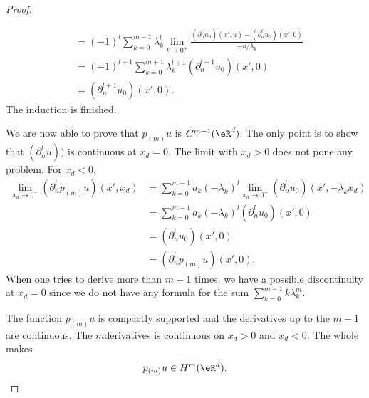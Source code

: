\begin{proof}
\begin{subproof}
\begin{subequations}
\begin{align}
                    &=(-1)^l\sum_{k=0}^{m-1}\lambda_k^l\lim_{t\to 0^+} \frac{    (\partial_n^lu_0)(x',u)- (\partial_n^lu_0)(x',0)   }{ -u/\lambda_k }\\
                    &=(-1)^{l+1}\sum_{k=0}^{m+1}\lambda_k^{l+1}(\partial_n^{l+1}u_0)(x',0)\\
                    &=(\partial^{l+1}_nu_0)(x',0).
                \end{align}
            \end{subequations}
            The induction is finished.
    \end{subproof}
    We are now able to prove that \( p_{(m)}u\) is \( C^{m-1}(\eR^d)\). The only point is to show that \( (\partial^l_nu))\) is continuous at \( x_d=0\). The limit with \( x_d>0\) does not pone any problem. For \( x_d<0\),
    \begin{subequations}
        \begin{align}
            \lim_{x_d\to 0^-}(\partial_n^lp_{(m)}u)(x',x_d)&=\sum_{k=0}^{m-1}a_k(-\lambda_k)^l\lim_{x_d\to 0^-}(\partial_n^lu_0)(x',-\lambda_kx_d)\\
            &=\sum_{k=0}^{m-1}a_k(-\lambda_k)^l(\partial_n^lu_0)(x',0)\\
            &=(\partial_n^lu_0)(x',0)\\
            &=(\partial^l_np_{(m)}u)(x',0).
        \end{align}
    \end{subequations}
    When one tries to derive more than \( m-1\) times, we have a possible discontinuity at \( x_d=0\) since we do not have any formula for the sum \( \sum_{k=0}^{m-1}k\lambda_k^m\).

    The function \(p_{(m)}u\) is compactly supported and the derivatives up to the \( m-1\)\ieme are continuous. The \( m\)\ieme derivatives is continuous on \( x_d>0\) and \( x_d<0\). The whole makes
    \begin{equation}
        p_{(m)}u\in H^m(\eR^d).
    \end{equation}


\end{proof}
